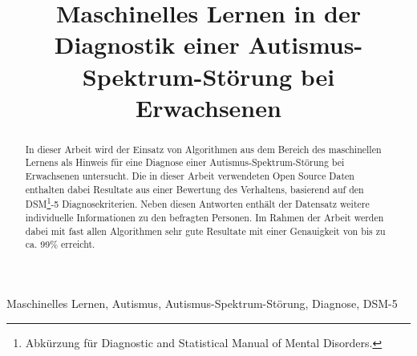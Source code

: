 \documentclass[conference]{IEEEtran}
\begin{document}
\title{Maschinelles Lernen in der Diagnostik einer Autismus-Spektrum-Störung bei Erwachsenen}

\author{
}

\maketitle

\begin{abstract}
In dieser Arbeit wird der Einsatz von Algorithmen aus dem Bereich des maschinellen Lernens als Hinweis für eine Diagnose einer Autismus-Spektrum-Störung bei Erwachsenen untersucht. Die in dieser Arbeit verwendeten Open Source Daten enthalten dabei Resultate aus einer Bewertung des Verhaltens, basierend auf den DSM\footnote{\label{foot:1}Abkürzung für \glqq Diagnostic and Statistical Manual of Mental Disorders\grqq{}.}-5 Diagnosekriterien. Neben diesen Antworten enthält der Datensatz weitere individuelle Informationen zu den befragten Personen. Im Rahmen der Arbeit werden dabei mit fast allen Algorithmen sehr gute Resultate mit einer Genauigkeit von bis zu ca. 99\% erreicht.
\end{abstract}

\begin{IEEEkeywords}
Maschinelles Lernen, Autismus, Autismus-Spektrum-Störung, Diagnose, DSM-5
\end{IEEEkeywords}














\printbibliography
\end{document}
